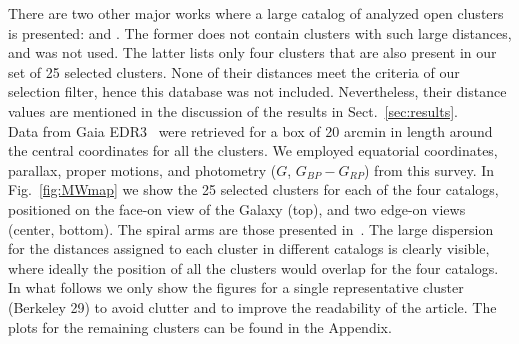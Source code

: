 \documentclass{aa}
\begin{document}
 There are two other major works where a large catalog of analyzed open clusters
 is presented: \cite{Lui_2019} and \cite{Dias_2021}. The former does not contain
 clusters with such large distances, and was not used. The latter lists
 only four clusters that are also present in our set of 25  selected
 clusters. None of their distances meet the criteria of  our selection filter, hence this
 database was not included. Nevertheless, their distance values are
   mentioned in the discussion of the results in Sect.~\ref{sec:results}.\\

 Data from Gaia EDR3~\citep{Gaia_2016,Gaia_EDR3} were retrieved for a box of 20
 arcmin in length around the central coordinates for all the clusters. We
 employed equatorial coordinates, parallax, proper motions, and photometry
 ($G$, $G_{BP}-G_{RP}$) from this survey.
 In Fig.~\ref{fig:MWmap} we show the 25 selected clusters for each of
 the four catalogs, positioned on the face-on view of the Galaxy (top), and
 two edge-on views (center, bottom). The spiral arms are those presented
 in~\cite{Momany_2006}. The large dispersion for the distances
 assigned to each cluster in different catalogs is clearly visible, where
 ideally the position of all the clusters would overlap for the four catalogs.\\

 In what follows we  only show the figures for a single representative
 cluster (Berkeley 29) to avoid  clutter and to improve the readability of the
 article. The plots for the remaining clusters can be found in the Appendix.
\end{document}
